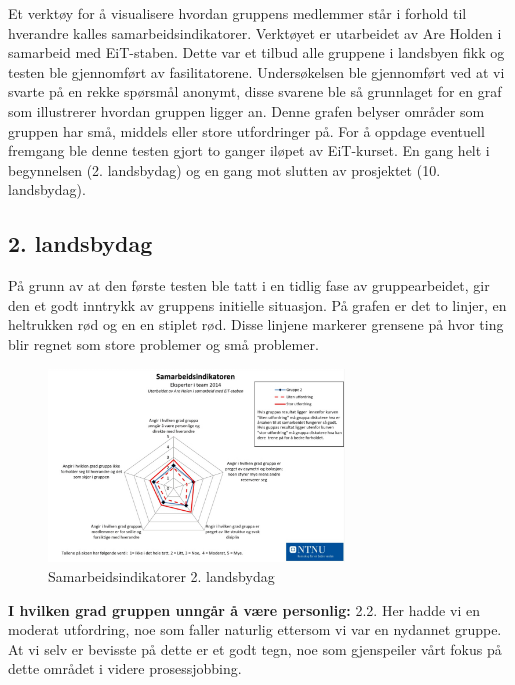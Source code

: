 Et verktøy for å visualisere hvordan gruppens medlemmer står i forhold til hverandre kalles samarbeidsindikatorer. 
Verktøyet er utarbeidet av Are Holden i samarbeid med EiT-staben. 
Dette var et tilbud alle gruppene i landsbyen fikk og testen ble gjennomført av fasilitatorene. 
Undersøkelsen ble gjennomført ved at vi svarte på en rekke spørsmål anonymt, disse svarene ble så grunnlaget for en graf som illustrerer hvordan gruppen ligger an.
Denne grafen belyser områder som gruppen har små, middels eller store utfordringer på. 
For å oppdage eventuell fremgang ble denne testen gjort to ganger iløpet av EiT-kurset. En gang helt i begynnelsen (2. landsbydag) og en gang mot slutten av prosjektet (10. landsbydag). 

\subsection{2. landsbydag}
På grunn av at den første testen ble tatt i en tidlig fase av gruppearbeidet, gir den et godt inntrykk av gruppens initielle situasjon. 
På grafen er det to linjer, en heltrukken rød og en en stiplet rød. 
Disse linjene markerer grensene på hvor ting blir regnet som store problemer og små problemer. 
\begin{figure}[H]
    \centering
    \includegraphics[width=0.7\textwidth]{images/samarbeidsindikator1.jpeg} 
    \caption{Samarbeidsindikatorer 2. landsbydag}
    \label{fig:sam1}
\end{figure}

\noindent \textbf{I hvilken grad gruppen unngår å være personlig:} 2.2.
\newline
\noindent Her hadde vi en moderat utfordring, noe som faller naturlig ettersom vi var en nydannet gruppe.
 At vi selv er bevisste på dette er et godt tegn, noe som gjenspeiler vårt fokus på dette området i videre prosessjobbing.
\vspace{\secspace}

